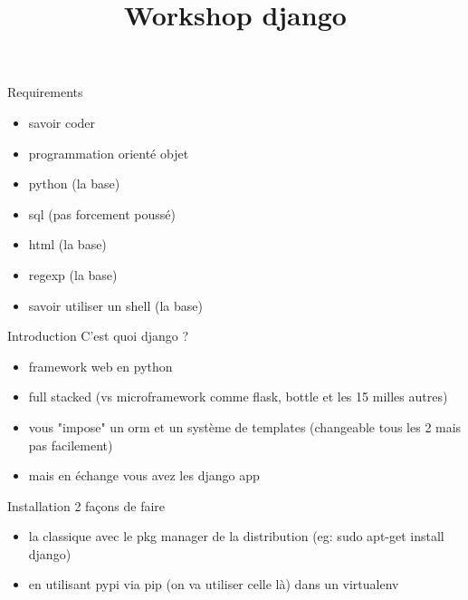 \documentclass{beamer}
\begin{document}
\title{Workshop django}

\maketitle{}

\begin{frame}{Requirements}
\begin{itemize}
    \item savoir coder
    \item programmation orienté objet
    \item python (la base)
    \item sql (pas forcement poussé)
    \item html (la base)
    \item regexp (la base)
    \item savoir utiliser un shell (la base)
\end{itemize}
\end{frame}

\begin{frame}{Introduction}
    C'est quoi django ?
    \begin{itemize}
        \item framework web en python\pause
        \item full stacked (vs microframework comme flask, bottle et les 15 milles autres)\pause
        \item vous "impose" un orm et un système de templates (changeable tous les 2 mais pas facilement)\pause
        \item mais en échange vous avez les django app
    \end{itemize}
\end{frame}

\begin{frame}{Installation}
2 façons de faire
\begin{itemize}
    \item la classique avec le pkg manager de la distribution (eg: sudo apt-get install django)
    \item en utilisant pypi via pip (on va utiliser celle là) dans un virtualenv
\end{itemize}
\end{frame}
\end{document}
